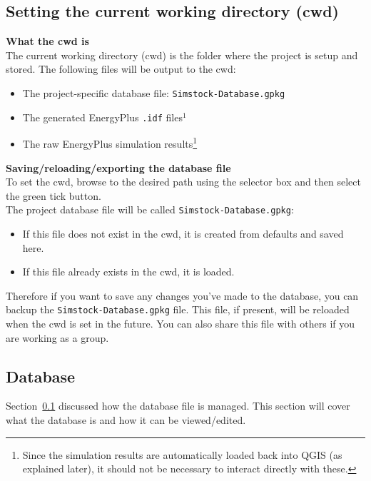 \documentclass{article}
\begin{document}
\subsection{Setting the current working directory (cwd)}
\label{section:cwd}
\textbf{What the cwd is} \\
The current working directory (cwd) is the folder where the project is setup and stored. The following files will be output to the cwd:
\begin{itemize}
    \item The project-specific database file: \texttt{Simstock-Database.gpkg} %
    \item The generated EnergyPlus \texttt{.idf} files$^{\mathrm{1}}$
    \item The raw EnergyPlus simulation results\footnote{Since the simulation results are automatically loaded back into QGIS (as explained later), it should not be necessary to interact directly with these.}
\end{itemize}
\textbf{Saving/reloading/exporting the database file} \\
To set the cwd, browse to the desired path using the selector box and then select the green tick button. \\

The project database file will be called \texttt{Simstock-Database.gpkg}:
\begin{itemize}
    \item If this file does not exist in the cwd, it is created from defaults and saved here.
    \item If this file already exists in the cwd, it is loaded.
\end{itemize}
Therefore if you want to save any changes you've made to the database, you can backup the \texttt{Simstock-Database.gpkg} file. This file, if present, will be reloaded when the cwd is set in the future. You can also share this file with others if you are working as a group.

\subsection{Database}
\label{section:database}
Section~\ref{section:cwd} discussed how the database file is managed. This section will cover what the database is and how it can be viewed/edited. \\
\end{document}
